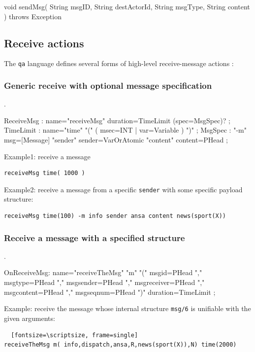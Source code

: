 \begin{javacode}
void sendMsg( String msgID, String destActorId, String msgType, String content ) throws Exception
\end{javacode} 

 
\subsection{Receive actions}
 
The \texttt{qa} language defines several forms of high-level receive-message actions  : 
 
\subsubsection{Generic receive with optional message specification}.
\begin{javacode}  
ReceiveMsg : name="receiveMsg" duration=TimeLimit (spec=MsgSpec)? ;
	TimeLimit : name="time" "(" ( msec=INT | var=Variable ) ")" ;
	MsgSpec   : "-m" msg=[Message]  "sender" sender=VarOrAtomic "content" content=PHead ; 
\end{javacode}

\noindent Example1: receive a message
\begin{Verbatim}[fontsize=\scriptsize, frame=single]
receiveMsg time( 1000 )   
\end{Verbatim}	

\noindent Example2: receive a message  from a specific \texttt{sender} with some specific payload structure:
 \begin{Verbatim}[fontsize=\scriptsize, frame=single]
receiveMsg time(100) -m info sender ansa content news(sport(X)) 
\end{Verbatim}

\subsubsection{Receive a message with a specified structure}.
 
\begin{javacode}  
OnReceiveMsg: name="receiveTheMsg" "m" "(" msgid=PHead ","   msgtype=PHead "," msgsender=PHead 
 	"," msgreceiver=PHead "," msgcontent=PHead "," msgseqnum=PHead ")" duration=TimeLimit  ;
\end{javacode}

\noindent Example: receive the message whose internal structure \texttt{msg/6} is unifiable with the given arguments:
\begin{Verbatim}  [fontsize=\scriptsize, frame=single]
receiveTheMsg m( info,dispatch,ansa,R,news(sport(X)),N) time(2000) 
\end{Verbatim}

